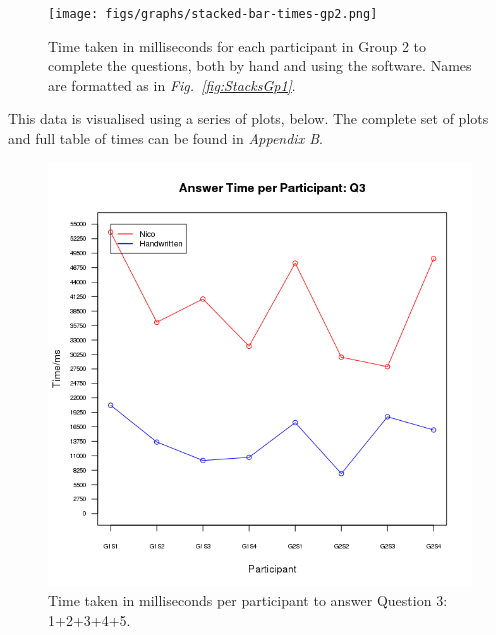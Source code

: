 \documentclass[12pt,twoside,notitlepage,xetex]{report}
\begin{document}
\begin{center}
\begin{figure}[H]
\begin{center}
\texttt{[image: figs/graphs/stacked-bar-times-gp2.png]}
\end{center}
\caption{Time taken in milliseconds for each participant in Group 2 to complete the questions, both by hand and using the software.  Names are formatted as in \emph{Fig.~\ref{fig:StacksGp1}}.}
\label{fig:StacksGp2}
\end{figure}
\end{center}

This data is visualised using a series of plots, below.  The complete set of plots and full table of times can be found in \emph{Appendix B}.

\begin{center}
\begin{figure}[H]
\begin{center}
\includegraphics[width=\textwidth-5cm]{figs/graphs/q3.png}
\end{center}
\caption{Time taken in milliseconds per participant to answer Question 3: 1+2+3+4+5.}
\label{fig:PlotQ3}
\end{figure}
\end{center}
\end{document}
